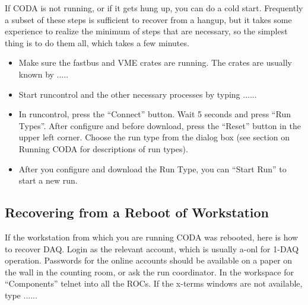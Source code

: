 {{\par
If CODA is not running, or if it gets hung up,
you can do a cold start.  Frequently a subset of
these steps is sufficient to recover from a hangup,
but it takes some experience to realize the
minimum of steps that
are necessary, so the simplest 
thing is to do them all, which takes a few minutes.

\begin{itemize}
\item{Make sure the fastbus and VME crates are
running.  The crates are usually known by .....
 }
\item{ Start runcontrol and the other necessary
processes by typing ......}
\item{ In runcontrol,
press the ``Connect'' button.  
Wait 5 seconds and press ``Run Types''.  
After configure and before download, 
press the ``Reset'' button in the upper left corner.
Choose the run type from the dialog box
(see section on Running
CODA for descriptions of run types).}
\item{ After you configure and download the Run Type,
you can ``Start Run'' to start a new run.}


\end{itemize}


\subsection{ Recovering from a Reboot of Workstation}

If the workstation from which you are running CODA
was rebooted, here is how to recover DAQ.
Login as the relevant account, which is usually
a-onl for 1-DAQ operation. Passwords for the online
accounts should be available on a paper on the wall
in the counting room, or ask the run coordinator.
In the workspace for ``Components'' telnet into
all the ROCs.  If the x-terms windows are not 
available, type ......
}

}
